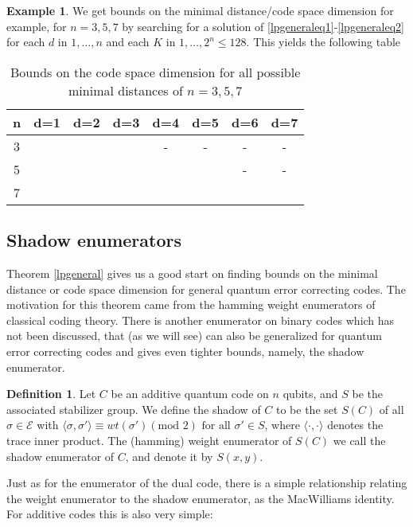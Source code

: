 \documentclass{article}
\def\E{\mathcal{E}}
\def\fa{\text{ for all }}
\theoremstyle{definition}
\newtheorem{ex}[Satz]{Example}
\newtheorem{defn}[Satz]{Definition}
\begin{document}
\begin{ex}\label{exbounds1}
We get bounds on the minimal distance/code space dimension for example, for $n = 3,5,7$ by searching for a solution of \ref{lpgeneraleq1}-\ref{lpgeneraleq2} for each $d$ in $1, \ldots, n$ and each $K$ in $1,\ldots,2^n \leq 128$. This yields the following table

\begin{table}[h]\label{tablebounds1}
\centering
\begin{tabular}{|c|c|c|c|c|c|c|c|}
\hline

n & d=1 & d=2 & d=3 & d=4 & d=5 & d=6 & d=7\\ \hline
3 & & & & - & - & - & - \\ \hline
5 & & & & & & - & -  \\ \hline
7 & & & & & & &  \\ \hline 
\end{tabular}
\caption{Bounds on the code space dimension for all possible minimal distances of $n = 3,5,7$}
\end{table}
\end{ex}

\subsection{Shadow enumerators}

Theorem \ref{lpgeneral} gives us a good start on finding bounds on the minimal distance or code space dimension for general quantum error correcting codes.
The motivation for this theorem came from the hamming weight enumerators of classical coding theory. There is another enumerator on binary codes which has not been discussed, that (as we will see) can also be generalized for quantum error correcting codes and gives even tighter bounds, namely, the shadow enumerator.

\begin{defn}
Let $C$ be an additive quantum code on $n$ qubits, and $S$ be the associated stabilizer group. We define the shadow of $C$ to be the set $S(C)$ of all $\sigma \in \E$ with $\langle \sigma, \sigma' \rangle \equiv wt(\sigma') (\text{mod }2) \fa \sigma' \in S$, where $\langle \cdot , \cdot \rangle$ denotes the trace inner product.
The (hamming) weight enumerator of $S(C)$ we call the shadow enumerator of $C$, and denote it by $S(x,y)$.
\end{defn}

Just as for the enumerator of the dual code, there is a simple relationship relating the weight enumerator to the shadow enumerator, as the MacWilliams identity. For additive codes this is also very simple:
\end{document}
